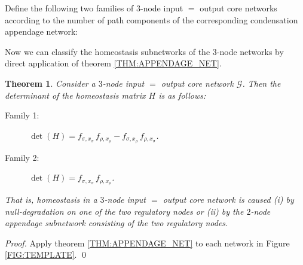 \documentclass[a4paper,fleqn]{cas-dc}
\newtheorem{theorem}{Theorem}[section]
\newcommand{\END}{\hfill\mbox{\raggedright \mbox{\raisebox{2pt}{\scalebox{0.6}{$\Diamond$}}}}\medskip}
\begin{document}
\begin{definition} \normalfont
Define the following two families of $3$-node input $=$ output core networks according to the number of path components of the corresponding condensation appendage network:
\end{definition}

Now we can classify the homeostasis subnetworks of the $3$-node networks by direct application of theorem \ref{THM:APPENDAGE_NET}.

\begin{theorem} \label{thm:det_i=o}
Consider a $3$-node input $=$ output core network $\mathcal{G}$.
Then the determinant of the homeostasis matrix $H$ is as follows:
\begin{description}
\item[Family 1:] $\det(H)=f_{\sigma,x_\sigma}\, f_{\rho,x_{\rho}}-f_{\sigma,x_{\rho}} \, f_{\rho,x_{\sigma}}$.
\item[Family 2:] $\det(H)=f_{\sigma,x_\sigma}\, f_{\rho,x_{\rho}}$.
\end{description}
That is, homeostasis in a $3$-node input $=$ output core network is caused (i) by null-degradation on one of the two regulatory nodes or (ii) by the $2$-node appendage subnetwork consisting of the two regulatory nodes.
\end{theorem}
\begin{proof}
Apply theorem \ref{THM:APPENDAGE_NET} to each network in Figure \ref{FIG:TEMPLATE}.
\qed
\end{proof}
\end{document}
